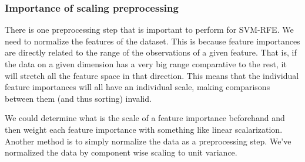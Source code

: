 \subsubsection*{Importance of scaling preprocessing}

There is one preprocessing step that is important to perform for SVM-RFE. We need to normalize the features of the dataset. This is because feature importances are directly related to the range of the observations of a given feature. That is, if the data on a given dimension has a very big range comparative to the rest, it will stretch all the feature space in that direction. This means that the individual feature importances will all have an individual scale, making comparisons between them (and thus sorting) invalid.

We could determine what is the scale of a feature importance beforehand and then weight each feature importance with something like linear scalarization. An\-oth\-er method is to simply normalize the data as a preprocessing step. We've nor\-mal\-ized the data by component wise scaling to unit variance. 


